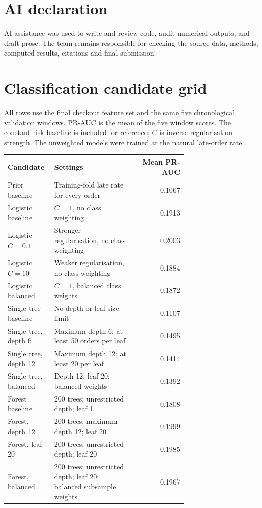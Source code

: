 \documentclass[12pt,a4paper]{article}
\begin{document}
\section*{AI declaration}
AI assistance was used to write and review code, audit numerical outputs, and draft prose. The team remains responsible for checking the source data, methods, computed results, citations and final submission.
\appendix
\section{Classification candidate grid}
\label{app:grid}
All rows use the final checkout feature set and the same five chronological validation windows. PR-AUC is the mean of the five window scores. The constant-risk baseline is included for reference; $C$ is inverse regularisation strength. The unweighted models were trained at the natural late-order rate.

\begin{center}\small
\begin{tabular}{@{}p{0.26\linewidth}p{0.44\linewidth}r@{}}
\toprule
Candidate & Settings & Mean PR-AUC \\
\midrule
Prior baseline & Training-fold late rate for every order & 0.1067 \\
Logistic baseline & $C=1$, no class weighting & 0.1913 \\
Logistic $C=0.1$ & Stronger regularisation, no class weighting & 0.2003 \\
Logistic $C=10$ & Weaker regularisation, no class weighting & 0.1884 \\
Logistic balanced & $C=1$, balanced class weights & 0.1872 \\
Single tree baseline & No depth or leaf-size limit & 0.1107 \\
Single tree, depth 6 & Maximum depth 6; at least 50 orders per leaf & 0.1495 \\
Single tree, depth 12 & Maximum depth 12; at least 20 per leaf & 0.1414 \\
Single tree, balanced & Depth 12; leaf 20; balanced weights & 0.1392 \\
Forest baseline & 200 trees; unrestricted depth; leaf 1 & 0.1808 \\
Forest, depth 12 & 200 trees; maximum depth 12; leaf 20 & 0.1999 \\
Forest, leaf 20 & 200 trees; unrestricted depth; leaf 20 & 0.1985 \\
Forest, balanced & 200 trees; unrestricted depth; leaf 20; balanced subsample weights & 0.1967 \\
\bottomrule
\end{tabular}
\end{center}
\end{document}
